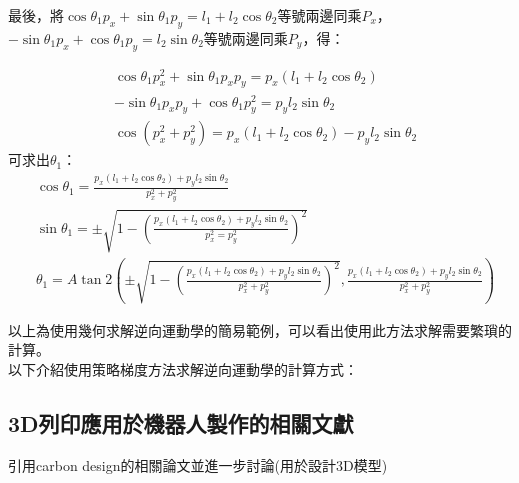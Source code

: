 \documentclass[class=NCU_thesis, crop=false]{standalone}
\begin{document}
最後，將$\cos \theta_1 p_{x}+\sin \theta_1 p_{y}=l_1+l_2 \cos \theta_2$等號兩邊同乘$P_x$，$-\sin \theta_1 p_{x} + \cos \theta_1 p_{y} = l_2 \sin \theta_2$等號兩邊同乘$P_y$，得：

$$
\begin{aligned}
& \cos \theta_1 p_{x}^2 + \sin \theta_1 p_x p_y = p_x \left(l_1 + l_2 \cos \theta_2 \right) \\
& - \sin \theta_1 p_x p_y + \cos \theta_1 p_{y}^2 = p_y l_2 \sin \theta_2 \\
& \cos \left(p_{x}^2+p_{y}^2 \right) = p_x \left(l_1+l_2 \cos \theta_2 \right) - p_y l_2 \sin \theta_2
\end{aligned}
$$
可求出$\theta_1$：
$$
\begin{aligned}
& \cos \theta_1= \frac{p_x \left(l_1+l_2 \cos \theta_2 \right)+p_y l_2 \sin \theta_2}{p_x^2 + p_y^2} \\
& \sin \theta_1= \pm \sqrt{1-\left(\frac{p_{x} \left(l_1 + l_2 \cos \theta_2 \right)+p_y l_2 \sin \theta_2}{p_x^2 = p_y^2}\right)^2} \\
& \theta_1=A \tan 2\left( \pm \sqrt{1-\left(\frac{p_{x}\left(l_1+l_2 \cos \theta_2\right)+p_{y} l_2 \sin \theta_2}{p_{x}^2+p_{y}^2}\right)^2}, \frac{p_{x}\left(l_1+l_2 \cos \theta_2\right)+p_{y} l_2 \sin \theta_2}{p_{x}^2+p_{y}^2}\right)
\end{aligned}
$$

以上為使用幾何求解逆向運動學的簡易範例，可以看出使用此方法求解需要繁瑣的計算。 \\

以下介紹使用策略梯度方法求解逆向運動學的計算方式：

\subsection{3D列印應用於機器人製作的相關文獻}
引用carbon design的相關論文並進一步討論(用於設計3D模型)
\end{document}

